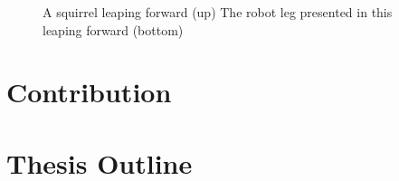 \begin{figure}
	\centering
	\caption{A squirrel leaping forward (up) The robot leg presented in this leaping forward (bottom)}
	\label{fig:both_jump}
\end{figure}


\section{Contribution}
\label{sec:contribution}

\section{Thesis Outline}
\label{sec:outline}


